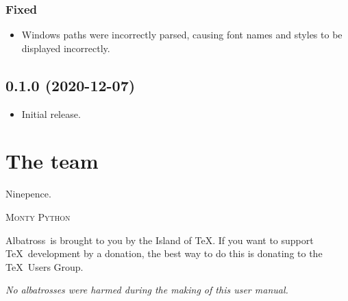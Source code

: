 \documentclass[12pt,article,a4paper,oneside]{memoir}
\newcommand{\albatross}{Albatross}
\begin{document}
\subsection*{Fixed}

\begin{itemize}[label={--}]
\item Windows paths were incorrectly parsed, causing font names and styles to be
displayed incorrectly.
\end{itemize}

\section*{0.1.0 (2020-12-07)}

\begin{itemize}[label={--}]
\item Initial release.
\end{itemize}

\chapter*{The team}

\epigraph{Ninepence.}{\textsc{Monty Python}}

\albatross\ is brought to you by the Island of \TeX. If you want to support
\TeX\ development by a donation, the best way to do this is donating to the
\TeX\ Users Group.

\vfill

{\centering\footnotesize\em No albatrosses were harmed during the making of this
user manual.\par}
\end{document}
